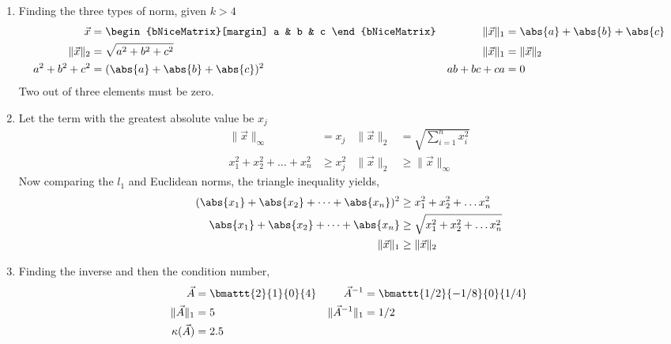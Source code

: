 \begin{enumerate}
    \item Finding the three types of norm, given $ k > 4 $
          \begin{align}
              \vec{x}                 & = \begin{bNiceMatrix}[margin]
                                              a & b & c
                                          \end{bNiceMatrix}     &
              \lVert \vec{x} \rVert_1 & = \abs{a} + \abs{b} + \abs{c}       \\
              \lVert \vec{x} \rVert_2 & = \sqrt{a^2 + b^2 + c^2}          &
              \lVert \vec{x} \rVert_1 & = \lVert \vec{x} \rVert_2           \\
              a^2 + b^2 + c^2         & = (\abs{a} + \abs{b} + \abs{c})^2 &
              ab + bc + ca            & = 0
          \end{align}
          Two out of three elements must be zero.

    \item Let the term with the greatest absolute value be $ x_j $
          \begin{align}
              \lVert \vec{x} \rVert_\infty  & = x_j                             &
              \lVert \vec{x} \rVert_2       & = \sqrt{\sum_{i=1}^{n}x_i^2}        \\
              x_1^2 + x_2^2 + \dots + x_n^2 & \geq x_j^2                        &
              \lVert \vec{x} \rVert_2       & \geq \lVert \vec{x} \rVert_\infty
          \end{align}
          Now comparing the $ l_1 $ and Euclidean norms, the triangle inequality yields,
          \begin{align}
              (\abs{x_1} + \abs{x_2} + \dots + \abs{x_n})^2
                                      & \geq x_1^2 + x_2^2 + \dots x_n^2        \\
              \abs{x_1} + \abs{x_2} + \dots + \abs{x_n}
                                      & \geq \sqrt{x_1^2 + x_2^2 + \dots x_n^2} \\
              \lVert \vec{x} \rVert_1 & \geq \lVert \vec{x} \rVert_2
          \end{align}

    \item Finding the inverse and then the condition number,
          \begin{align}
              \vec{A}                      & = \bmattt{2}{1}{0}{4}        &
              \vec{A}^{-1}                 & = \bmattt{1/2}{-1/8}{0}{1/4}   \\
              \lVert \vec{A} \rVert_1      & = 5                          &
              \lVert \vec{A}^{-1} \rVert_1 & = 1/2                          \\
              \kappa(\vec{A})              & = 2.5
          \end{align}


\end{enumerate}
